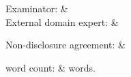 \ifx\examiner\empty
\relax
\else
\ifx\externalexpert\empty
\relax
\else
\begin{infoblock}
  Examinator: & \examiner\\
  External domain expert: & \externalexpert\\
\end{infoblock}
\fi
\fi


\begin{infoblock}
Non-disclosure agreement: & \hasnda
\end{infoblock}

\begin{infoblock}
word count: &  words.
\end{infoblock}

\clearpage